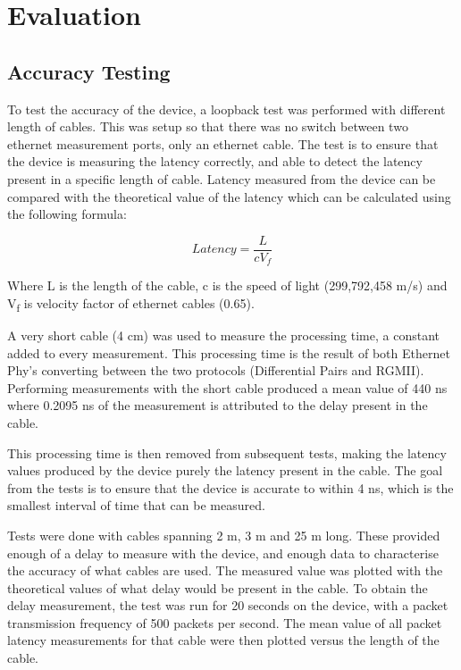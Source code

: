 \chapter{Evaluation}\label{C:eval}

\section{Accuracy Testing}
\par To test the accuracy of the device, a loopback test was performed with different length of cables. This was 
setup so that there was no switch between two ethernet measurement ports, only an ethernet cable. The test is to 
ensure that the device is measuring the latency correctly, and able to detect the latency present in a specific 
length of cable. Latency measured from the device can be compared with the theoretical value of the latency which 
can be calculated using the following formula:

\[Latency = \frac{L}{cV_f}\]

\par Where L is the length of the cable, c is the speed of light (299,792,458 m/s) and V\textsubscript{f} is 
velocity factor of ethernet cables (0.65). 

\par A very short cable (4 cm) was used to measure the processing time, a constant added to every measurement. 
This processing time is the result of both Ethernet Phy’s converting between the two protocols (Differential Pairs 
and RGMII). Performing measurements with the short cable produced a mean value of 440 ns where 0.2095 ns of the 
measurement is attributed to the delay present in the cable.

\par This processing time is then removed from subsequent tests, making the latency values produced by the device 
purely the latency present in the cable. The goal from the tests is to ensure that the device is accurate to within
4 ns, which is the smallest interval of time that can be measured.

\par Tests were done with cables spanning 2 m, 3 m and 25 m long. These provided enough of a delay to measure with the
device, and enough data to characterise the accuracy of what cables are used. The measured value was plotted with 
the theoretical values of what delay would be present in the cable. To obtain the delay measurement, the test was 
run for 20 seconds on the device, with a packet transmission frequency of 500 packets per second. The mean value
of all packet latency measurements for that cable were then plotted versus the length of the cable.

